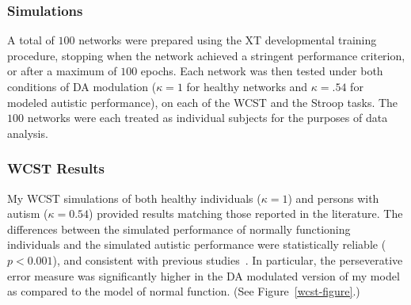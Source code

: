 \subsubsection{Simulations} 
A total of $100$ networks were prepared using the XT developmental
training procedure, stopping when the network achieved a stringent
performance criterion, or after a maximum of $100$ epochs.  Each
network was then tested under both conditions of DA modulation ($\kappa = 1$ for healthy networks and $\kappa = .54$ for modeled autistic performance), on
each of the WCST and the Stroop tasks.  The $100$ networks were each
treated as individual subjects for the purposes of data analysis.

\subsubsection{WCST Results} 
My WCST simulations of both healthy individuals ($\kappa = 1$) and persons with autism ($\kappa = 0.54$) 
provided results matching those reported in the literature.  The differences between the 
simulated performance of normally functioning individuals and the
simulated autistic performance were statistically reliable
($p < 0.001$), and consistent with previous
studies~\cite{PriorMR:1990:AutismWCST,Ozonoff:1999:AutismStroopWCST,MinshewNJ:2002:AutismWCST}.
In particular, the perseverative error measure was significantly
higher in the DA modulated version of my model as compared to the
model of normal function.  (See Figure~\ref{wcst-figure}.)



